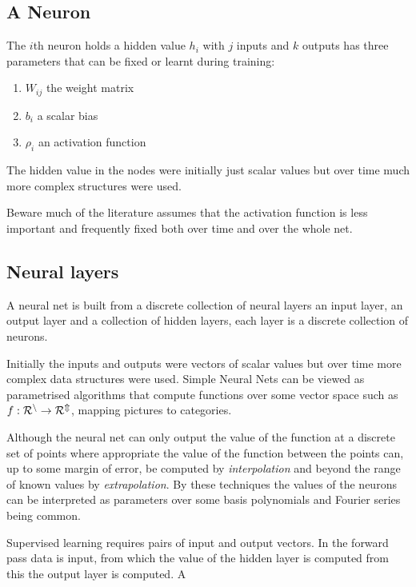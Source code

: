  \subsection{A Neuron}
The $i$th neuron holds a hidden value $h_i$ with $j$ inputs and $k$ outputs has three  parameters that can be fixed or learnt during training:
\begin{center}\begin{minipage}{2in}
\begin{enumerate}
\item $W_{ij}$ the weight matrix
\item $b_i$ a scalar bias
\item $\rho_i$ an activation function
\end{enumerate}\end{minipage}\end{center}
The hidden value in the nodes were initially just scalar values but over time much more complex structures were used.

Beware much of the literature assumes that the activation function is less important and frequently  fixed both over time and over the whole net.  
  
  \subsection{Neural layers}
  A neural net is built from a  discrete collection of neural layers an input layer, an output layer and a collection of hidden layers, each layer is a discrete collection of neurons.
  
  Initially the inputs and outputs were vectors of scalar values but over time more complex data structures were used. Simple  Neural Nets can be viewed  as  parametrised algorithms that compute functions over some vector space such as $f:\cal{R}^n\rightarrow\cal{R}^m$, mapping pictures to categories. 
  
 Although the neural net can only output the value of the function at a discrete set of points where appropriate the value of the function between the points can, up to some margin of error, be computed by \emph{interpolation} and beyond the range of known values by \emph{extrapolation}. By these techniques the values of the neurons can be interpreted as parameters over some basis polynomials and Fourier series being common. 
 
Supervised learning requires pairs of input and output vectors. In the forward pass  data is input, from which  the value of the hidden layer is computed from this the output layer is computed. 
A


